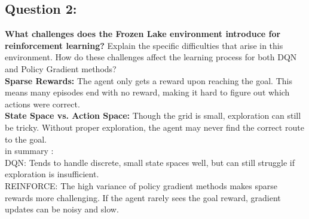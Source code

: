 \documentclass[12pt]{article}
\begin{document}
{{{				\subsection{Question 2:}
				\textbf{ What challenges does the Frozen Lake environment introduce for reinforcement learning?}
				\newline
				Explain the specific difficulties that arise in this environment. How do these challenges affect the learning process for both DQN and Policy Gradient methods?\\
				\textbf{Sparse Rewards:}
				The agent only gets a reward upon reaching the goal. This means many episodes end with no reward, making it hard to figure out which actions were correct.\\
				\textbf{State Space vs. Action Space:}
				Though the grid is small, exploration can still be tricky. Without proper exploration, the agent may never find the correct route to the goal.\\
				in summary :\\
				DQN: Tends to handle discrete, small state spaces well, but can still struggle if exploration is insufficient.\\
				REINFORCE: The high variance of policy gradient methods makes sparse rewards more challenging. If the agent rarely sees the goal reward, gradient updates can be noisy and slow.
				
}}}
\end{document}
